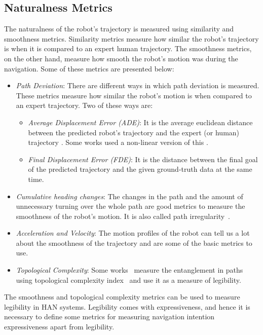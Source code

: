 \subsection{Naturalness Metrics}
The naturalness of the robot's trajectory is measured using similarity and smoothness metrics. Similarity metrics measure how similar the robot's trajectory is when it is compared to an expert human trajectory. The smoothness metrics, on the other hand, measure how smooth the robot's motion was during the navigation. Some of these metrics are presented below:
\begin{itemize}
    \item \textit{Path Deviation}: There are different ways in which path deviation is measured. These metrics measure how similar the robot's motion is when compared to an expert trajectory. Two of these ways are:
    \begin{itemize}
        \item \textit{Average Displacement Error (ADE)}: It is the average euclidean distance between the predicted robot's trajectory and the expert (or human) trajectory \cite{pellegrini2009you}. Some works used a non-linear version of this \cite{alahi2016social}.
        \item \textit{Final Displacement Error (FDE)}: It is the distance between the final goal of the predicted trajectory and the given ground-truth data at the same time.
    \end{itemize} 
    \item \textit{Cumulative heading changes}: The changes in the path and the amount of unnecessary turning over the whole path are good metrics to measure the smoothness of the robot's motion. It is also called path irregularity~\cite{guzzi2013human}.
    \item \textit{Acceleration and Velocity}: The motion profiles of the robot can tell us a lot about the smoothness of the trajectory and are some of the basic metrics to use.
    \item \textit{Topological Complexity}: Some works~\cite{mavrogiannis2018social, mavrogiannis2019effects} measure the entanglement in paths using topological complexity index~\cite{dynnikov2007complexity} and use it as a measure of legibility. 
\end{itemize}

The smoothness and topological complexity metrics can be used to measure legibility in HAN systems. Legibility comes with expressiveness, and hence it is necessary to define some metrics for measuring navigation intention expressiveness apart from legibility.


